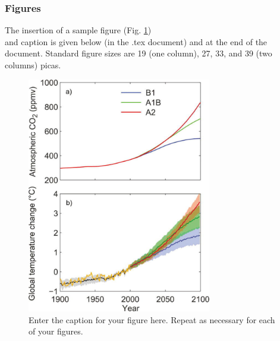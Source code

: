 \documentclass[draft]{ametsoc}
\begin{document}
\hypertarget{figures}{%
\subsubsection{Figures}\label{figures}}

The insertion of a sample figure (Fig. \ref{f1})\\
and caption is given below (in the .tex document) and at the end of the
document. Standard figure sizes are 19 (one column), 27, 33, and 39 (two
columns) picas.

\begin{figure}[h]
 \centerline{\includegraphics[width=19pc]{figure01.pdf}}
  \caption{Enter the caption for your figure here.  Repeat as
  necessary for each of your figures.}\label{f1}
\end{figure}
\end{document}
